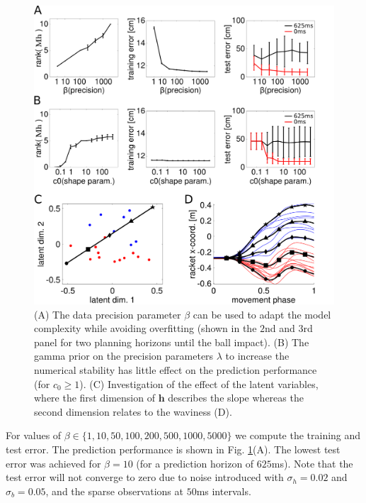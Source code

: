 \begin{figure}
\begin{center}
\includegraphics[width=0.48\columnwidth]{elmarICRA/pics/PingPong_Robustness.png}
\end{center}
\caption{(A) The data precision parameter $\beta$ can be used to adapt the model complexity while avoiding overfitting (shown in the $2$nd and $3$rd panel for two planning horizons until the ball impact). 
(B) The gamma prior on the precision parameters $\lambda$ to increase the numerical stability has little effect on the prediction performance (for $c_0 \ge 1$). 
(C) Investigation of the effect of the latent variables, where the first dimension of $\textbf{h}$ describes the slope whereas the second dimension relates to the waviness (D).
\label{fig:pingpong_model}}
\end{figure}

For values of $\beta \in \{1, 10, 50, 100, 200, 500, 1000, 5000\}$ we compute
the training and test error. The prediction
performance is shown in Fig. \ref{fig:pingpong_model}(A). The lowest test error was
achieved for $\beta=10$ (for a prediction horizon of $625$ms).  Note that the test error will not converge to zero
due to noise introduced with $\sigma_h=0.02$ and $\sigma_b = 0.05$, and the
sparse observations at $50$ms intervals.





